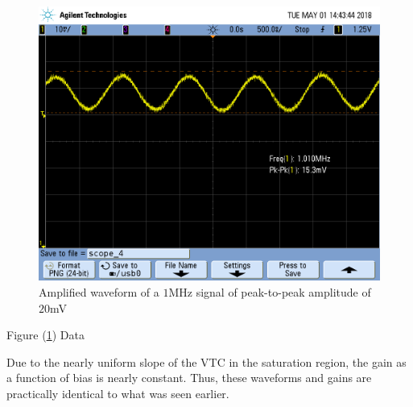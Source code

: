 \FloatBarrier

\begin{figure}[h!]
	\centering
	\includegraphics[scale=0.75]{./images/SCOPE_4.PNG}
	\caption{Amplified waveform of a $1$\si{\mega\hertz} signal of peak-to-peak amplitude of $20$\si{\milli\volt}}
	\label{fig:SCOPE_4}
\end{figure}

\FloatBarrier

\begin{table}[h!]
	\centering
	\caption{Figure (\ref{fig:SCOPE_4}) Data}
	\label{tab:gain_part1_plus10mV}
\end{table}

\FloatBarrier

Due to the nearly uniform slope of the VTC in the saturation region, the gain as a function of bias is nearly constant. Thus, these waveforms and gains are practically identical to what was seen earlier.
